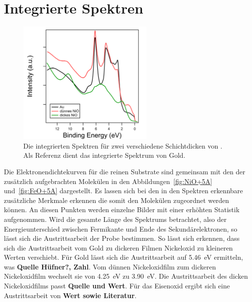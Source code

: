     \section{Integrierte Spektren}
    \label{sec:EDC}
        \begin{figure}
            \centering
            \includegraphics[width=0.6\textwidth]{./content/pictures/NiO_Filmdicke}
            \caption{Die integrierten Spektren für zwei verschiedene Schichtdicken von . Als Referenz dient das integrierte Spektrum von Gold.}
            \label{fig:NiO_Filmdicke}
        \end{figure}
        Die Elektronendichtekurven für die reinen Substrate sind gemeinsam mit den der zusätzlich aufgebrachten Molekülen in den Abbildungen~\ref{fig:NiO+5A} und~\ref{fig:FeO+5A} dargestellt.
        Es lassen sich bei den in den Spektren erkennbare zusätzliche Merkmale erkennen die somit den Molekülen zugeordnet werden können.
        An diesen Punkten werden einzelne Bilder mit einer erhöhten Statistik aufgenommen.
        Wird die gesamte Länge des Spektrums betrachtet, also der Energieunterschied zwischen Fermikante und Ende des Sekundärelektronen, so lässt sich die Austrittsarbeit der Probe bestimmen.
        So lässt sich erkennen, dass sich die Austrittsarbeit vom Gold zu dickeren Filmen Nickeloxid zu kleineren Werten verschiebt.
        Für Gold lässt sich die Austrittsarbeit auf \SI{5.46}{\electronvolt} ermitteln, was \textbf{Quelle Hüfner?, Zahl}.
        Vom dünnen Nickeloxidfilm zum dickeren Nickeloxidfilm wechselt sie von \SI{4.25}{\electronvolt} zu \SI{3.90}{\electronvolt}.
        Die Austrittsarbeit des dicken Nickeloxidfilms passt \textbf{Quelle und Wert}.
        Für das Eisenoxid ergibt sich eine Austrittsarbeit von \textbf{Wert sowie Literatur}.

